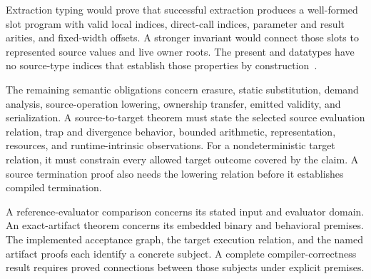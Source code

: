 \documentclass[11pt]{article}
\newcommand{\code}[1]{\texttt{\seqsplit{#1}}}
\begin{document}
Extraction typing would prove that successful extraction produces a well-formed slot program with valid local indices, direct-call indices, parameter and result arities, and fixed-width offsets.  A stronger invariant would connect those slots to represented source values and live owner roots.  The present \code{IR.Expr} and \code{IR.Stmt} datatypes have no source-type indices that establish those properties by construction~\cite{ir}.

The remaining semantic obligations concern erasure, static substitution, demand analysis, source-operation lowering, ownership transfer, emitted validity, and serialization.  A source-to-target theorem must state the selected source evaluation relation, trap and divergence behavior, bounded arithmetic, representation, resources, and runtime-intrinsic observations.  For a nondeterministic target relation, it must constrain every allowed target outcome covered by the claim.  A source termination proof also needs the lowering relation before it establishes compiled termination.

A reference-evaluator comparison concerns its stated input and evaluator domain.  An exact-artifact theorem concerns its embedded binary and behavioral premises.  The implemented acceptance graph, the target execution relation, and the named artifact proofs each identify a concrete subject.  A complete compiler-correctness result requires proved connections between those subjects under explicit premises.
\end{document}
